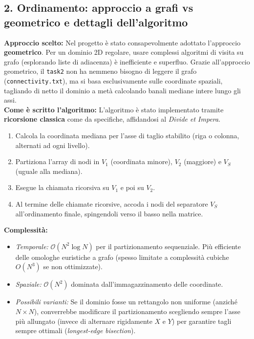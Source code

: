 \documentclass[a4paper,11pt]{article}
\theoremstyle{definition}
\begin{document}
\subsection{2. Ordinamento: approccio a grafi vs geometrico e dettagli dell'algoritmo}
\textbf{Approccio scelto:} Nel progetto è stato consapevolmente adottato l'approccio \textbf{geometrico}. Per un dominio 2D regolare, usare complessi algoritmi di visita su grafo (esplorando liste di adiacenza) è inefficiente e superfluo. Grazie all'approccio geometrico, il \texttt{task2} non ha nemmeno bisogno di leggere il grafo (\texttt{connectivity.txt}), ma si basa esclusivamente sulle coordinate spaziali, tagliando di netto il dominio a metà calcolando banali mediane intere lungo gli assi.
\\
\textbf{Come è scritto l'algoritmo:}
  L'algoritmo è stato implementato tramite \textbf{ricorsione classica} come da specifiche, affidandosi al \textit{Divide et Impera}.
  \begin{enumerate}
      \item Calcola la coordinata mediana per l'asse di taglio stabilito (riga o colonna, alternati ad ogni livello).
      \item Partiziona l'array di nodi in $V_1$ (coordinata minore), $V_2$ (maggiore) e $V_S$ (uguale alla mediana).
      \item Esegue la chiamata ricorsiva su $V_1$ e poi su $V_2$.
      \item Al termine delle chiamate ricorsive, accoda i nodi del separatore $V_S$ all'ordinamento finale, spingendoli verso il basso nella matrice.
  \end{enumerate}
\textbf{Complessità:} 
\begin{itemize}
    \item \textit{Temporale:} $\mathcal{O}(N^2 \log N)$ per il partizionamento sequenziale. Più efficiente delle omologhe euristiche a grafo (spesso limitate a complessità cubiche $O(N^3)$ se non ottimizzate).
    \item \textit{Spaziale:} $\mathcal{O}(N^2)$ dominata dall'immagazzinamento delle coordinate.
    \item \textit{Possibili varianti:} Se il dominio fosse un rettangolo non uniforme (anziché $N \times N$), converrebbe modificare il partizionamento scegliendo sempre l'asse più allungato (invece di alternare rigidamente $X$ e $Y$) per garantire tagli sempre ottimali (\textit{longest-edge bisection}).
\end{itemize}
\end{document}
